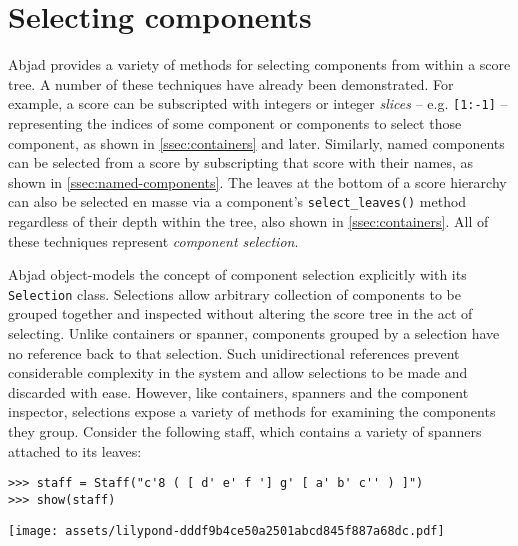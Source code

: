 \section{Selecting components}
\label{sec:selecting-components}

Abjad provides a variety of methods for selecting components from within a
score tree. A number of these techniques have already been demonstrated. For
example, a score can be subscripted with integers or integer \emph{slices} --
e.g. \texttt{[1:-1]} -- representing the indices of some component or
components to select those component, as shown in \autoref{ssec:containers}
and later. Similarly, named components can be selected from a score by
subscripting that score with their names, as shown in
\autoref{ssec:named-components}. The leaves at the bottom of a score hierarchy
can also be selected en masse via a component's \texttt{select\_leaves()}
method regardless of their depth within the tree, also shown in
\autoref{ssec:containers}. All of these techniques represent \emph{component
selection}.

Abjad object-models the concept of component selection explicitly with its
\texttt{Selection} class. Selections allow arbitrary collection of components
to be grouped together and inspected without altering the score tree in the act
of selecting. Unlike containers or spanner, components grouped by a selection
have no reference back to that selection. Such unidirectional references
prevent considerable complexity in the system and allow selections to be made
and discarded with ease. However, like containers, spanners and the component
inspector, selections expose a variety of methods for examining the components
they group. Consider the following staff, which contains a variety of spanners
attached to its leaves:

\begin{comment}
<abjad>
staff = Staff("c'8 ( [ d' e' f '] g' [ a' b' c'' ) ]")
show(staff)
</abjad>
\end{comment}

\begin{abjadbookoutput}
\begin{singlespacing}
\vspace{-0.5\baselineskip}
\begin{verbatim}
>>> staff = Staff("c'8 ( [ d' e' f '] g' [ a' b' c'' ) ]")
>>> show(staff)
\end{verbatim}
\noindent\texttt{[image: assets/lilypond-dddf9b4ce50a2501abcd845f887a68dc.pdf]}
\end{singlespacing}
\end{abjadbookoutput}

